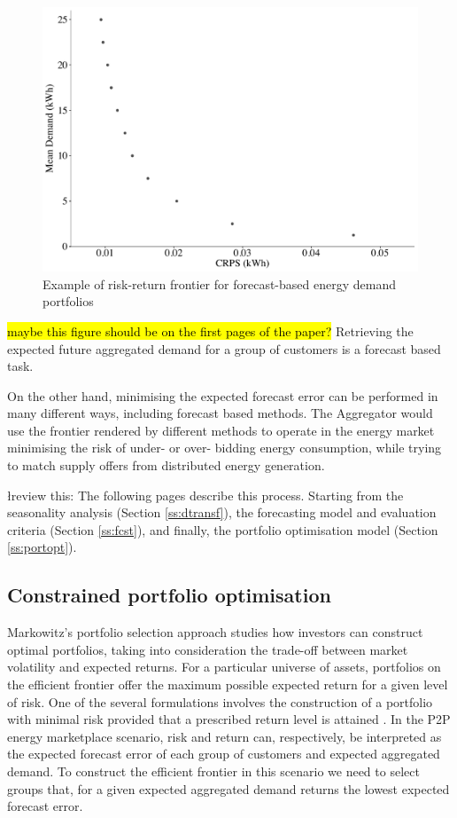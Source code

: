 \documentclass[review, 3p, 12pt, authoryear]{elsarticle}
\begin{document}
\begin{figure}
  \centering
  \includegraphics[width=0.8\columnwidth]{2017-11-15_randomgrouping}
  \caption{Example of risk-return frontier for forecast-based energy demand portfolios}
  \label{fig:portoptex}
\end{figure}
\hl{maybe this figure should be on the first pages of the paper?}
Retrieving the expected future aggregated demand for a group of customers is a forecast based task.

On the other hand, minimising the expected forecast error can be performed in many different ways, including forecast based methods.
The Aggregator would use the frontier rendered by different methods to operate in the energy market minimising the risk of under- or over- bidding energy consumption, while trying to match supply offers from distributed energy generation.

\l{review this:} The following pages describe this process. Starting from the seasonality analysis (Section \ref{ss:dtransf}), the forecasting model and evaluation criteria (Section \ref{ss:fcst}), and finally, the portfolio optimisation model (Section \ref{ss:portopt}).

\subsection{Constrained portfolio optimisation}
\label{ss:sdevgrp}
Markowitz’s portfolio selection approach studies how investors can construct optimal portfolios, taking into consideration the trade-off between market volatility and expected returns.
For a particular universe of assets, portfolios on the efficient frontier offer the maximum possible expected return for a given level of risk.
One of the several formulations involves the construction of a portfolio with minimal risk provided that a prescribed return level is attained \citep{bonami2009portopt}.
In the P2P energy marketplace scenario, risk and return can, respectively, be interpreted as the expected forecast error of each group of customers and expected aggregated demand.
To construct the efficient frontier in this scenario we need to select groups that, for a given expected aggregated demand returns the lowest expected forecast error.
\end{document}
